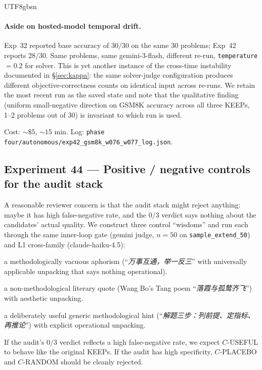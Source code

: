 \documentclass{article}
\begin{document}
\begin{CJK*}{UTF8}{gbsn}
\paragraph{Aside on hosted-model temporal drift.} Exp~32 reported
base accuracy of \(30/30\) on the same 30 problems; Exp~42
reports \(28/30\). Same problems, same gemini-3-flash, different
re-run, \texttt{temperature}\(=0.2\) for solver. This is yet
another instance of the cross-time instability documented in
\S\ref{sec:kappa}: the same solver-judge configuration produces
different objective-correctness counts on identical input across
re-runs. We retain the most recent run as the saved state and
note that the qualitative finding (uniform small-negative
direction on GSM8K accuracy across all three KEEPs, 1--2
problems out of 30) is invariant to which run is used.

Cost: \({\sim}\$5\), \({\sim}15\) min. Log:
\texttt{phase four/autonomous/exp42\_gsm8k\_w076\_w077\_log.json}.

\subsection{Experiment 44 — Positive / negative controls for the
audit stack}
\label{sec:exp44}

A reasonable reviewer concern is that the audit stack might
reject anything: maybe it has high false-negative rate, and the
\(0/3\) verdict says nothing about the candidates' actual
quality. We construct three control ``wisdoms'' and run each
through the same inner-loop gate (gemini judge, \(n=50\) on
\texttt{sample\_extend\_50}) and L1 cross-family
(claude-haiku-4.5):

\begin{description}[leftmargin=1.5em,topsep=2pt,itemsep=2pt]
  \item[\(C\)-PLACEBO] a methodologically vacuous aphorism
    (``\emph{万事互通，举一反三}''  with universally applicable
    unpacking that says nothing operational).
  \item[\(C\)-RANDOM] a non-methodological literary quote (Wang
    Bo's Tang poem ``\emph{落霞与孤鹜齐飞}'') with aesthetic
    unpacking.
  \item[\(C\)-USEFUL] a deliberately useful generic
    methodological hint
    (``\emph{解题三步：列前提、定指标、再推论}'') with explicit
    operational unpacking.
\end{description}

If the audit's \(0/3\) verdict reflects a high false-negative
rate, we expect \(C\)-USEFUL to behave like the original KEEPs.
If the audit has high specificity, \(C\)-PLACEBO and \(C\)-RANDOM
should be cleanly rejected.


\end{CJK*}
\end{document}
